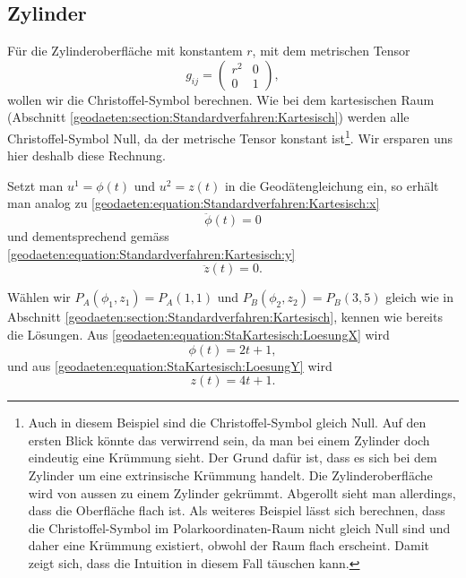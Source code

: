 %
%
%
%
\subsection{Zylinder\label{geodaeten:section:Standardverfahren:Zylinder}}

Für die Zylinderoberfläche mit konstantem $r$, mit dem metrischen Tensor 
\begin{equation}
	g_{ij} = \begin{pmatrix} 
		r^2 & 0 \\ 
		0 & 1 
	\end{pmatrix},
\end{equation}
wollen wir die Christoffel-Symbol berechnen. 
Wie bei dem kartesischen Raum (Abschnitt \ref{geodaeten:section:Standardverfahren:Kartesisch}) werden alle Christoffel-Symbol Null, da der metrische Tensor konstant ist\footnote{
Auch in diesem Beispiel sind die Christoffel-Symbol gleich Null.
Auf den ersten Blick könnte das verwirrend sein, da man bei einem Zylinder doch eindeutig eine Krümmung sieht.
Der Grund dafür ist, dass es sich bei dem Zylinder um eine extrinsische Krümmung handelt.
Die Zylinderoberfläche wird von aussen zu einem Zylinder gekrümmt.
Abgerollt sieht man allerdings, dass die Oberfläche flach ist.
Als weiteres Beispiel lässt sich berechnen, dass die Christoffel-Symbol im Polarkoordinaten-Raum nicht gleich Null sind und daher eine Krümmung existiert, obwohl der Raum flach erscheint.
Damit zeigt sich, dass die Intuition in diesem Fall täuschen kann.
}.
Wir ersparen uns hier deshalb diese Rechnung.

Setzt man $u^1 = \phi (t)$ und $u^2 = z(t)$ in die Geodätengleichung ein, so erhält man analog zu \eqref{geodaeten:equation:Standardverfahren:Kartesisch:x}
\begin{equation}
	\ddot{\phi}(t) = 0
	\label{geodaeten:equation:Standardverfahren:Zylinder:phi}
\end{equation}
und dementsprechend gemäss \eqref{geodaeten:equation:Standardverfahren:Kartesisch:y}
\begin{equation}
	\ddot{z}(t) = 0 .
\end{equation}


Wählen wir $P_A(\phi_1 , z_1) = P_A(1 , 1)$ und $P_B(\phi_2 , z_2) = P_B(3 , 5)$ gleich wie in Abschnitt \ref{geodaeten:section:Standardverfahren:Kartesisch}, kennen wie bereits die Lösungen. 
Aus \eqref{geodaeten:equation:StaKartesisch:LoesungX} wird 
\begin{equation}
	\phi(t) = 2t + 1 ,
\end{equation}
und aus \eqref{geodaeten:equation:StaKartesisch:LoesungY} wird
\begin{equation}
	z(t) = 4t + 1 .
\end{equation}

